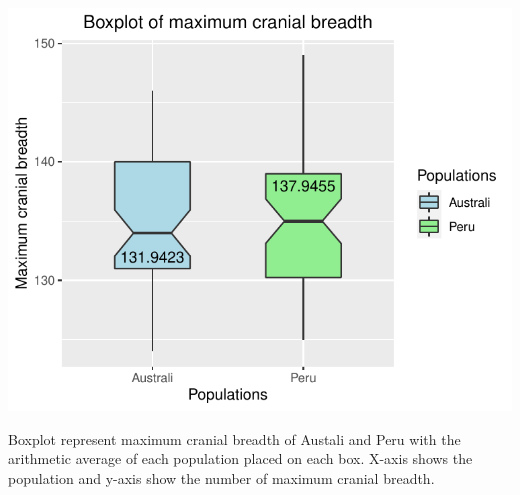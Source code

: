 \documentclass[12pt, oneside]{report}\usepackage[]{graphicx}\usepackage[]{color}
\makeatletter
\def\maxwidth{ %
  \ifdim\Gin@nat@width>\linewidth
    \linewidth
  \else
    \Gin@nat@width
  \fi
}
\makeatother
\begin{document}
\begin{Schunk}


{\centering \includegraphics[width=\maxwidth]{figure/unnamed-chunk-7-1} 

}

\end{Schunk}
Boxplot represent maximum cranial breadth of Austali and Peru with the arithmetic average of each population placed on each box. X-axis shows the population and y-axis show the number of maximum cranial breadth.\\
\end{document}
